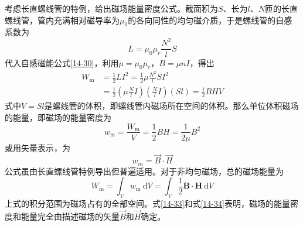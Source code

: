 \documentclass[12pt]{article}
\begin{document}
考虑长直螺线管的特例，给出磁场能量密度公式。截面积为\(S\)、长为\(l\)、\(N\)匝的长直螺线管，管内充满相对磁导率为\(\mu_0\)的各向同性的均匀磁介质，于是螺线管的自感系数为
$$
L=\mu_0 \mu_r \frac{N^2}{l} S
$$
代入自感磁能公式\ref{14-30}，利用\(\mu = \mu_0 \mu_r\)，\(B = \mu n I\)，得出
\begin{equation}
\begin{aligned}
W_{\mathrm{m}} & =\frac{1}{2} L I^2=\frac{1}{2} \mu \frac{N^2}{l} S I^2 \\
& =\frac{1}{2}\left(\mu \frac{N}{l} I\right)\left(\frac{N}{l} I\right)(S l)=\frac{1}{2} B H V
\end{aligned}
\end{equation}
式中\(V=Sl\)是螺线管的体积，即螺线管内磁场所在空间的体积。那么单位体积磁场的能量，即磁场的能量密度为
\begin{equation}
w_{\mathrm{m}}=\frac{W_{\mathrm{m}}}{V}=\frac{1}{2} B H=\frac{1}{2 \mu} B^2
\label{14-32}
\end{equation}
或用矢量表示，为
\begin{equation}
    w_m = \overrightarrow{B} \cdot \overrightarrow{H}
    \label{14-33}
\end{equation}
公式虽由长直螺线管特例导出但普遍适用。对于非均匀磁场，总的磁场能量为
\begin{equation}
W_{\mathrm{m}}=\int_V w_{\mathrm{m}} \mathrm{~d} V=\int_V \frac{1}{2} \boldsymbol{B} \cdot \boldsymbol{H} \mathrm{~d} V
\label{14-34}
\end{equation}
上式的积分范围为磁场占有的全部空间。式\ref{14-33}和式\ref{14-34}表明，磁场的能量密度和能量完全由描述磁场的矢量\(\overrightarrow{B}\)和\(\overrightarrow{H}\)确定。
\end{document}
